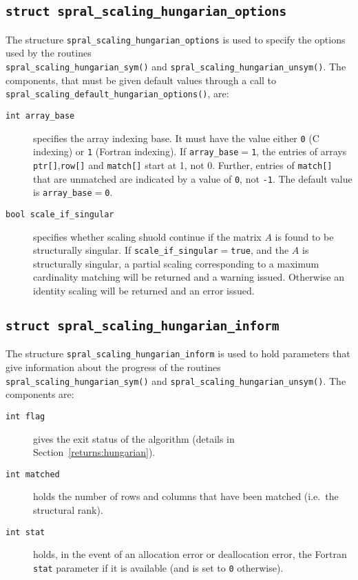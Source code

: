 \subsection{\texttt{struct spral\_scaling\_hungarian\_options}} \label{type:hungarian_options}

The structure \texttt{spral\_scaling\_hungarian\_options} is used to specify the
options used by the routines \\\texttt{spral\_scaling\_hungarian\_sym()} and \texttt{spral\_scaling\_hungarian\_unsym()}. The components,
that must be given default values through a call to \texttt{spral\_scaling\_default\_hungarian\_options()}, are:

\begin{description}

\item[\texttt{int array\_base}] specifies the array indexing base. It must
   have the value either \texttt{0} (C indexing) or \texttt{1} (Fortran
   indexing). If \texttt{array\_base}$=$\texttt{1}, the entries of arrays
   \texttt{ptr[]},\texttt{row[]} and \texttt{match[]} start at 1, not 0.
   Further, entries of \texttt{match[]} that are unmatched are indicated by a
   value of \texttt{0}, not \texttt{-1}.
   The default value is \texttt{array\_base}$=$\texttt{0}.

\item[\texttt{bool scale\_if\_singular}]
specifies whether scaling shuold continue if the matrix $A$ is found to be
structurally singular. If \texttt{scale\_if\_singular}$=$\texttt{true},
and the $A$ is structurally singular, a partial scaling corresponding to a
maximum cardinality matching will be returned and a warning issued. Otherwise
an identity scaling will be returned and an error issued.

\end{description}

\subsection{\texttt{struct spral\_scaling\_hungarian\_inform}} \label{type:hungarian_inform}

The structure \texttt{spral\_scaling\_hungarian\_inform} is used to hold parameters
that give information about the progress of the routines
\texttt{spral\_scaling\_hungarian\_sym()} and \texttt{spral\_scaling\_hungarian\_unsym()}. The components are:

\begin{description}

\item[\texttt{int flag}] gives the exit status of the algorithm (details in Section~\ref{returns:hungarian}).

\item[\texttt{int matched}] holds the number of rows and columns that have been matched (i.e.~the structural rank).

\item[\texttt{int stat}] holds, in the event of an allocation error or deallocation error, the Fortran \texttt{stat} parameter if it is available (and is set to \texttt{0} otherwise).
\end{description}

